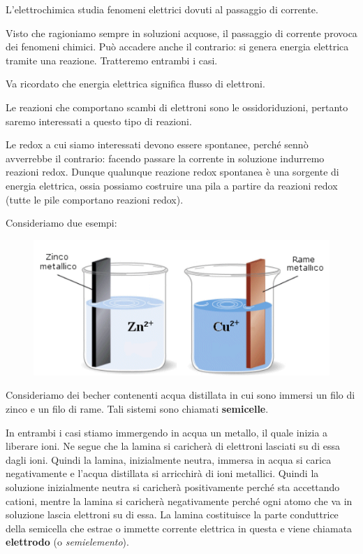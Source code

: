 L'elettrochimica studia fenomeni elettrici dovuti al passaggio di corrente.

Visto che ragioniamo sempre in soluzioni acquose, il passaggio di corrente provoca dei fenomeni chimici. Può accadere anche il contrario: si genera energia elettrica tramite una reazione. Tratteremo entrambi i casi.

\vspace{0.2cm}Va ricordato che energia elettrica significa flusso di elettroni.

Le reazioni che comportano scambi di elettroni sono le ossidoriduzioni, pertanto saremo interessati a questo tipo di reazioni.

Le redox a cui siamo interessati devono essere spontanee, perché sennò avverrebbe il contrario: facendo passare la corrente in soluzione indurremo reazioni redox. Dunque qualunque reazione redox spontanea è una sorgente di energia elettrica, ossia possiamo costruire una pila a partire da reazioni redox (tutte le pile comportano reazioni redox).

Consideriamo due esempi:

\begin{figure}[H]
    \centering
    \includegraphics[width=12cm]{immagini/piastre_metalliche.png}
\end{figure}

Consideriamo dei becher contenenti acqua distillata in cui sono immersi un filo di zinco e un filo di rame. Tali sistemi sono chiamati \textbf{semicelle}.

In entrambi i casi stiamo immergendo in acqua un metallo, il quale inizia a liberare ioni. Ne segue che la lamina si caricherà di elettroni lasciati su di essa dagli ioni. Quindi la lamina, inizialmente neutra, immersa in acqua si carica negativamente e l'acqua distillata si arricchirà di ioni metallici. Quindi la soluzione inizialmente neutra si caricherà positivamente perché sta accettando cationi, mentre la lamina si caricherà negativamente perché ogni atomo che va in soluzione lascia elettroni su di essa. La lamina costituisce la parte conduttrice della semicella che estrae o immette corrente elettrica in questa e viene chiamata \textbf{elettrodo} (o \textit{semielemento}).

